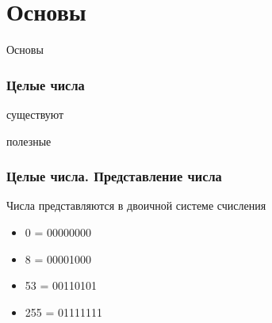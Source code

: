 \section{Основы}


\begin{frame}
    \center \Huge Основы
\end{frame}


\begin{frame}
    \frametitle{Целые числа}

    существуют

    полезные
\end{frame}


\begin{frame}
    \frametitle{Целые числа. Представление числа}
    Числа представляются в двоичной системе счисления

    \begin{itemize}
        \item 0 = 00000000
        \item 8 = 00001000
        \item 53 = 00110101
        \item 255 = 01111111
    \end{itemize}
\end{frame}


